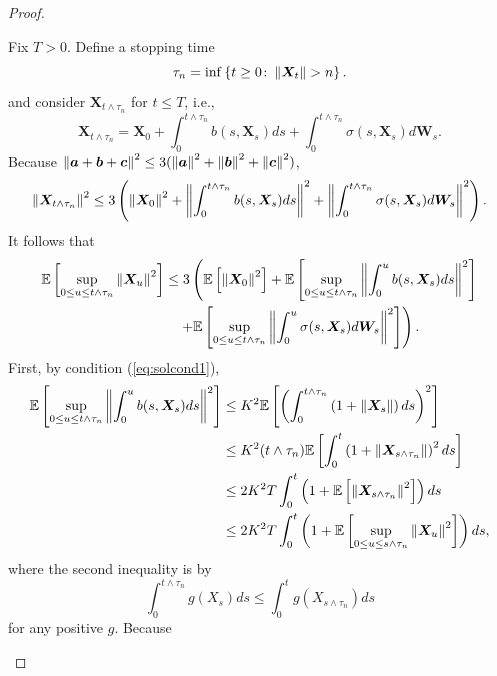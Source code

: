 \begin{proof}
\begin{itemize}
        Fix $T > 0$. Define a stopping time
        \begin{equation*}
            \tau_n = \inf\left\{t \geq 0 \colon \left\lVert\bm{X}_t\right\lVert > n\right\}.
        \end{equation*}
        and consider $\bm{X}_{t \wedge \tau_n}$ for $ t \leq T$, i.e.,
        \begin{equation*}
            \bm{X}_{t\wedge \tau_n} = \bm{X}_0 + \int_0^{t \wedge \tau_n}b(s,\bm{X}_s)ds + \int_0^{t \wedge \tau_n} \sigma(s,\bm{X}_s)d\bm{W}_s.
        \end{equation*}
        Because $\left\lVert\bm{a} + \bm{b} + \bm{c}\right\lVert^2 \leq 3(\left\lVert\bm{a}\right\lVert^2 + \left\lVert\bm{b}\right\lVert^2 + \left\lVert\bm{c}\right\lVert^2)$,
        \begin{equation*}
            \left\lVert\bm{X}_{t\wedge \tau_n}\right\lVert^2 \leq 3\left(\left\lVert\bm{X}_0\right\lVert^2+\left\lVert\int_0^{t \wedge \tau_n}b(s,\bm{X}_s)ds\right\lVert^2 + \left\lVert\int_0^{t \wedge \tau_n} \sigma(s,\bm{X}_s)d\bm{W}_s\right\lVert^2\right).
        \end{equation*}
        It follows that
        \begin{align*}
            \mathbb{E}\left[\sup_{0\leq u \leq t \wedge \tau_n}\left\lVert\bm{X}_{u}\right\lVert^2\right] &\leq 3\left(\mathbb{E}\left[\left\lVert\bm{X}_0\right\lVert^2\right]+\mathbb{E}\left[\sup_{0\leq u \leq t \wedge \tau_n}\left\lVert\int_0^{u}b(s,\bm{X}_s)ds\right\lVert^2\right] \right. \\
            &\quad \left.+ \mathbb{E}\left[\sup_{0\leq u \leq t \wedge \tau_n}\left\lVert\int_0^{u} \sigma(s,\bm{X}_s)d\bm{W}_s\right\lVert^2\right]\right).
        \end{align*}
        First, by condition (\ref{eq:solcond1}),
        \begin{align*}
            \mathbb{E}\left[\sup_{0\leq u \leq t \wedge \tau_n}\left\lVert\int_0^{u}b(s,\bm{X}_s)ds\right\lVert^2\right] &\leq K^2\mathbb{E}\left[\left(\int_0^{t \wedge \tau_n}\left(1+\left\lVert\bm{X}_s\right\lVert\right)ds\right)^2\right] \\
            &\leq K^2(t \wedge \tau_n) \mathbb{E}\left[\int_0^{t}\left(1+\left\lVert\bm{X}_{s \wedge \tau_n}\right\lVert\right)^2ds\right] \\
            &\leq 2K^2 T \int_0^{t} \left(1 + \mathbb{E}\left[\left\lVert\bm{X}_{s \wedge \tau_n}\right\lVert^2\right]\right)ds \\
            &\leq  2K^2 T \int_0^{t} \left(1 + \mathbb{E}\left[\sup_{0\leq u \leq s \wedge \tau_n}\left\lVert\bm{X}_{u}\right\lVert^2\right]\right)ds,
        \end{align*}
        where the second inequality is by
        \begin{equation*}
            \int^{t \wedge \tau_n}_0 g(X_s) ds \leq \int_0^t g(X_{s \wedge \tau_n})ds
        \end{equation*}
        for any positive $g$. Because
        \begin{equation*}

\end{equation*}
\end{itemize}
\end{proof}
